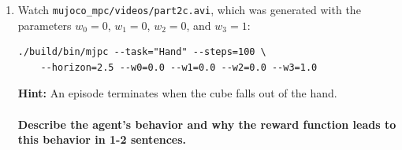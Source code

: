 \documentclass[12pt]{article}
\begin{document}
\begin{enumerate}
\begin{enumerate}[itemsep=20pt]
    \item Watch \texttt{mujoco\_mpc/videos/part2c.avi}, which was generated with the parameters $w_0 = 0$, $w_1 = 0$, $w_2 = 0$, and $w_3 = 1$:
\begin{tcolorbox}[width=\linewidth, sharp corners=all, colback=white!95!black]
\begin{verbatim}
./build/bin/mjpc --task="Hand" --steps=100 \
    --horizon=2.5 --w0=0.0 --w1=0.0 --w2=0.0 --w3=1.0
\end{verbatim}
\end{tcolorbox}
\textbf{Hint:} An episode terminates when the cube falls out of the hand.\\
\\
\textbf{\color{red}Describe the agent's behavior and why the reward function leads to this behavior in 1-2 sentences.}
    
\end{enumerate}

\end{enumerate}

\newpage
\end{document}
